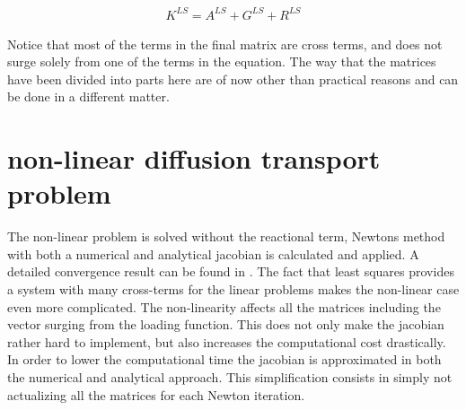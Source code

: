 \begin{align}
	K^{LS} = A^{LS} + G^{LS} + R^{LS}
	\label{eq:difftransMatrixSum}
\end{align}
%

Notice that most of the terms in the final matrix are cross terms, and does not surge solely from one of the terms in the equation. The way that the matrices have been divided into parts here are of now other than practical reasons and can be done in a different matter.  

\section{non-linear diffusion transport problem}
The non-linear problem is solved without the reactional term, Newtons method with both a numerical and analytical jacobian is calculated and applied. A detailed convergence result can be found in \cite{SM}. The fact that least squares provides a system with many cross-terms for the linear problems makes the non-linear case even more complicated. The non-linearity affects all the matrices including the vector surging from the loading function. This does not only make the jacobian rather hard to implement, but also increases the computational cost drastically. In order to lower the computational time the jacobian is approximated in both the numerical and analytical approach. This simplification consists in simply not actualizing all the matrices for each Newton iteration.   

